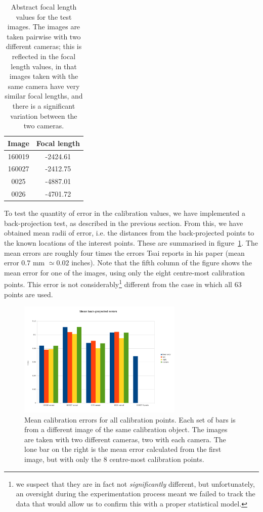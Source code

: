 \begin{table}[h]
  \centering
  \begin{tabular}{c c}
    \toprule
    \textbf{Image} & \textbf{Focal length}\\
    \midrule
    160019 & -2424.61\\
    160027 & -2412.75\\
    0025 & -4887.01\\
    0026 & -4701.72\\
    \bottomrule
  \end{tabular}
  \caption[Focal length values for the test images]{Abstract focal length
    values for the test images. The images are taken pairwise with two
    different cameras; this is reflected in the focal length values,
    in that images taken with the same camera have very similar focal
    lengths, and there is a significant variation between the two cameras.}
  \label{tbl:focal-lengths}
\end{table}

To test the quantity of error in the calibration values, we have
implemented a back-projection test, as described in the previous
section. From this, we have obtained mean radii of error, i.e. the
distances from the back-projected points to the known locations of the
interest points. These are summarised in
figure~\ref{fig:calib-errors}. The mean errors are roughly four times
the errors Tsai reports in his paper (mean error $0.7$ mm $\simeq0.02$
inches). Note that the fifth column of the figure shows the mean error for one
of the images, using only the eight centre-most calibration points.
This error is not considerably\footnote{we suspect that they are in fact not \emph{significantly} different, but unfortunately, an oversight during the experimentation process meant we failed to track the data that would allow us to confirm this with a proper statistical model.} different from the case in which all 63 points are used.

\begin{figure}[htb]
  \centering
  \includegraphics[width=0.7\textwidth]{figures/calibration-means}
  \caption[Mean calibration errors]{Mean calibration errors for all
    calibration points. Each set of bars is from a different image of
    the same calibration object. The images are taken with two
    different cameras, two with each camera. The lone bar on the right
    is the mean error calculated from the first image, but with only
    the 8 centre-most calibration points.}
  \label{fig:calib-errors}
\end{figure}

